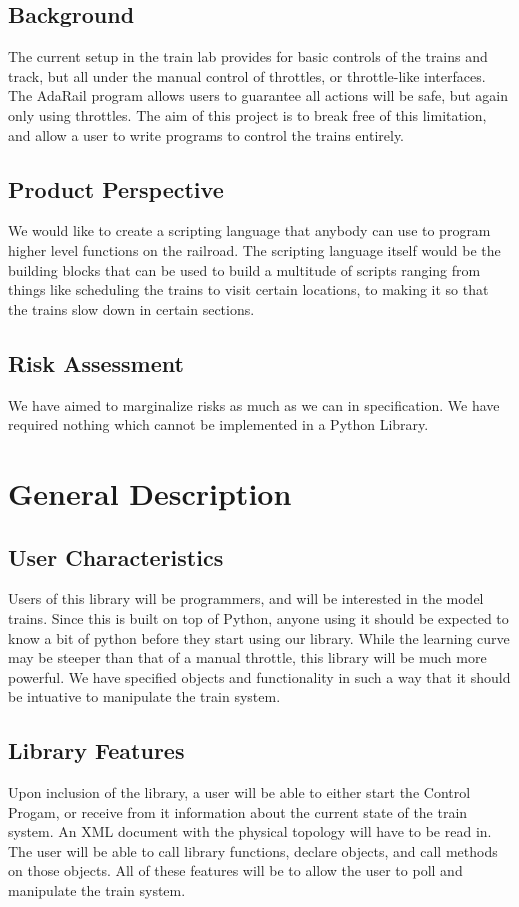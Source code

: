 \documentclass[a4paper,11pt,notitlepage]{article}
\def\CS{Control Progam\xspace}
\begin{document}
\subsection{Background}
The current setup in the train lab provides for basic controls of the trains and track, but all under the manual control of throttles, or throttle-like interfaces. The AdaRail program allows users to guarantee all actions will be safe, but again only using throttles. The aim of this project is to break free of this limitation, and allow a user to write programs to control the trains entirely.
\subsection{Product Perspective}
We would like to create a scripting language that anybody can use to program higher level functions on the railroad. The scripting language itself would be the building blocks that can be used to build a multitude of scripts ranging from things like scheduling the trains to visit certain locations, to making it so that the trains slow down in certain sections.
\subsection{Risk Assessment}
We have aimed to marginalize risks as much as we can in specification. We have required nothing which cannot be implemented in a Python Library.

\newpage
\section{General Description}
\subsection{User Characteristics}
Users of this library will be programmers, and will be interested in the model trains. Since this is built on top of Python, anyone using it should be expected to know a bit of python before they start using our library. While the learning curve may be steeper than that of a manual throttle, this library will be much more powerful. We have specified objects and functionality in such a way that it should be intuative to manipulate the train system.
\subsection{Library Features}
Upon inclusion of the library, a user will be able to either start the \CS, or receive from it information about the current state of the train system. An XML document with the physical topology will have to be read in. The user will be able to call library functions, declare objects, and call methods on those objects. All of these features will be to allow the user to poll and manipulate the train system.
\end{document}

